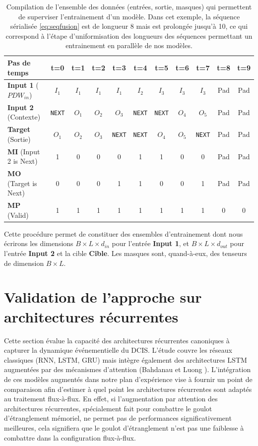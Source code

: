 \begin{table}[h]
\centering
\begin{tabular}{|l|c|c|c|c|c|c|c|c|c|c|}
\hline
\textbf{Pas de temps} & \textbf{t=0} & \textbf{t=1} & \textbf{t=2} & \textbf{t=3} & \textbf{t=4} & \textbf{t=5} & \textbf{t=6} & \textbf{t=7} & \textbf{t=8} & \textbf{t=9}\\
\hline
\textbf{Input 1} ($PDW_{in}$) & $I_1$ & $I_1$ & $I_1$ & $I_1$ & $I_2$ &$I_3$ & $I_3$&$I_3$ & Pad & Pad\\
\hline
\textbf{Input 2} (Contexte) & \texttt{NEXT}& $O_1$ & $O_2$ & $O_3$ & \texttt{NEXT} & \texttt{NEXT}& $O_4$  & $O_5$ & Pad & Pad\\
\hline
\textbf{Target} (Sortie) & $O_1$ & $O_2$ & $O_3$ & \texttt{NEXT} & \texttt{NEXT}& $O_4$  & $O_5$ & \texttt{NEXT} & Pad & Pad\\
\hline
\hline
\textbf{MI} (Input 2 is Next) & 1 & 0 & 0 & 0 & 1& 1& 0& 0& Pad & Pad\\
\hline
\textbf{MO} (Target is Next) & 0 & 0 & 0 & 1& 1& 0& 0& 1& Pad & Pad\\
\hline
\textbf{MP} (Valid) & 1 & 1 & 1 & 1 & 1& 1& 1& 1& 0&0\\
\hline
\end{tabular}
\caption{Compilation de l'ensemble des données (entrées, sortie, masques) qui permettent de superviser l'entrainement d'un modèle. Dans cet exemple, la séquence sérialisée \eqref{eq:seqfusion} est de longueur 8 mais est prolongée jusqu'à 10, ce qui correspond à l'étape d'uniformisation des longueurs des séquences permettant un entrainement en parallèle de nos modèles.}
\label{tab:seqfusion2}
\end{table}

Cette procédure permet de constituer des ensembles d'entrainement dont nous écrirons les dimensions $B \times L \times d_{in}$ pour l'entrée \textbf{Input 1}, et $B \times L \times d_{out}$ pour l'entrée \textbf{Input 2} et la cible \textbf{Cible}. Les masques sont, quand-à-eux, des tenseurs de dimension $B \times L$.

\section{Validation de l'approche sur architectures récurrentes}
\label{seq:validSSM}
Cette section évalue la capacité des architectures récurrentes canoniques à capturer la dynamique événementielle du DCIS. L'étude couvre les réseaux classiques (RNN, LSTM, GRU) mais intègre également des architectures LSTM augmentées par des mécanismes d'attention (Bahdanau \cite{bahdanau_neural_2014} et Luong \cite{luong_effective_2015}). L'intégration de ces modèles augmentés dans notre plan d'expérience vise à fournir un point de comparaison afin d'estimer à quel point les architectures récurrentes sont adaptés au traitement flux-à-flux. En effet, si l'augmentation par attention des architectures récurrentes, spécialement fait pour combattre le goulot d'étranglement mémoriel, ne permet pas de performances significativement meilleures, cela signifiera que le goulot d'étranglement n'est pas une faiblesse à combattre dans la configuration flux-à-flux.


